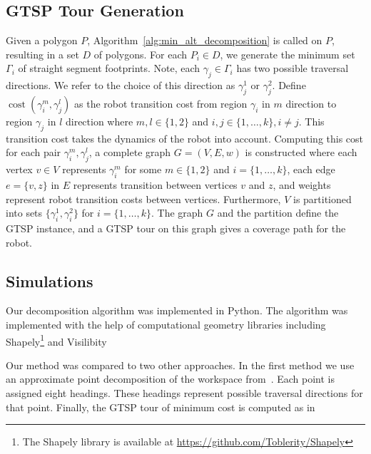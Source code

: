 \documentclass[../main.tex]{subfiles}
\begin{document}
\subsection{GTSP Tour Generation}
\label{sec:gtsp_tour}

Given a polygon $P$, Algorithm~\ref{alg:min_alt_decomposition} is called on $P$, resulting in a set $D$ of polygons. For each $P_i\in D$, we generate the minimum set $\Gamma_i$ of straight segment footprints. Note, each $\gamma_j\in\Gamma_i$ has two possible traversal directions. We refer to the choice of this direction as $\gamma_j^1$ or $\gamma_j^2$. Define $\operatorname{cost}(\gamma_i^m, \gamma_j^l)$ as the robot transition cost from region $\gamma_i$ in $m$ direction to region $\gamma_j$ in $l$ direction where $m,l\in\{1,2\}$ and $i,j\in\{1,\ldots,k\},i\neq j$. This transition cost takes the dynamics of the robot into account. Computing this cost for each pair $\gamma_i^m, \gamma_j^l$, a complete graph $G=(V,E,w)$ is constructed where each vertex $v\in V$ represents $\gamma^m_i$ for some $m\in\{1,2\}$ and $i=\{1,\ldots,k\}$, each edge $e=\{v,z\}$ in $E$ represents transition between vertices $v$ and $z$, and weights represent robot transition costs between vertices. Furthermore, $V$ is partitioned into sets $\{\gamma_i^1,\gamma_i^2\}$ for $i=\{1,\ldots,k\}$. The graph $G$ and the partition define the GTSP instance, and a GTSP tour on this graph gives a coverage path for the robot. 

\subsection{Simulations}
\label{sec:simulation}
Our decomposition algorithm was implemented in Python. The algorithm was implemented with the help of computational geometry libraries including Shapely\footnote{The Shapely library is available at \url{https://github.com/Toblerity/Shapely}} and Visilibity%

Our method was compared to two other approaches. In the first method we use an approximate point decomposition of the workspace from~\cite{arkin2000approximation}. Each point is assigned eight headings. These headings represent possible traversal directions for that point. Finally, the GTSP tour of minimum cost is computed as in%
\end{document}
